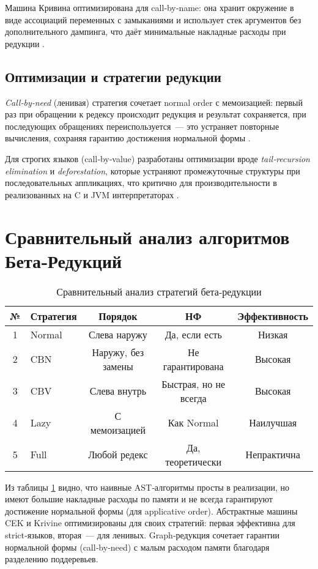 Машина Кривина оптимизирована для call‑by‑name: она хранит окружение в виде ассоциаций переменных с замыканиями и использует стек аргументов без дополнительного дампинга, что даёт минимальные накладные расходы при редукции \cite{Krivine2007}\cite{Barendregt1984}.  

\subsection{Оптимизации и стратегии редукции}
\emph{Call‑by‑need} (ленивая) стратегия сочетает normal order с мемоизацией: первый раз при обращении к редексу происходит редукция и результат сохраняется, при последующих обращениях переиспользуется — это устраняет повторные вычисления, сохраняя гарантию достижения нормальной формы \cite{Barendregt1993}\cite{Wadler1987}.  

Для строгих языков (call‑by‑value) разработаны оптимизации вроде \emph{tail‑recursion elimination} и \emph{deforestation}, которые устраняют промежуточные структуры при последовательных аппликациях, что критично для производительности в реализованных на C и JVM интерпретаторах \cite{PeytonJones1992}\cite{Wadler1990}.  


\section{Сравнительный анализ алгоритмов Бета‑Редукций}
\label{sec:comparison-beta}


\begin{table}[h]
\caption{Сравнительный анализ стратегий бета‑редукции}
\label{tbl:cmp-strategies}
\centering
\footnotesize
\begin{tabular}{|c|l|c|c|c|}
\hline
№ & Стратегия & Порядок & НФ & Эффективность \\
\hline
1 & Normal & Слева наружу & Да, если есть & Низкая \\
2 & CBN & Наружу, без замены & Не гарантирована & Высокая \\
3 & CBV & Слева внутрь & Быстрая, но не всегда & Высокая \\
4 & Lazy & С мемоизацией & Как Normal & Наилучшая \\
5 & Full & Любой редекс & Да, теоретически & Непрактична \\
\hline
\end{tabular}
\end{table}

\medskip

\noindent
Из таблицы \ref{tbl:cmp-strategies} видно, что наивные AST‑алгоритмы просты в реализации, но имеют большие накладные расходы по памяти и не всегда гарантируют достижение нормальной формы (для applicative order). Абстрактные машины CEK и Krivine оптимизированы для своих стратегий: первая эффективна для strict‑языков, вторая — для ленивых. Graph‑редукция сочетает гарантии нормальной формы (call‑by‑need) с малым расходом памяти благодаря разделению поддеревьев.





